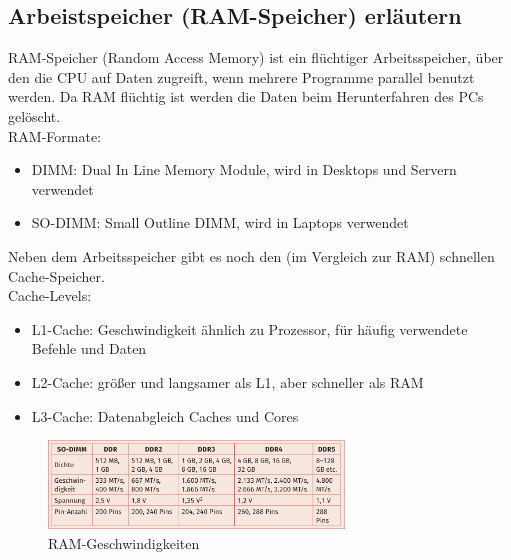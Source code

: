 \subsection{Arbeistspeicher (RAM-Speicher) erläutern}
    \begin{subindent}
        RAM-Speicher (Random Access Memory) ist ein flüchtiger Arbeitsspeicher, über den die CPU auf Daten zugreift, wenn mehrere Programme parallel benutzt werden. Da RAM flüchtig ist werden die Daten beim Herunterfahren des PCs gelöscht. \\
        RAM-Formate:
        \begin{itemize}[leftmargin=2.5cm,, itemsep=0.1em, parsep=0.3em]
            \item DIMM\@: Dual In Line Memory Module, wird in Desktops und Servern verwendet
            \item SO-DIMM\@: Small Outline DIMM, wird in Laptops verwendet
        \end{itemize}
        Neben dem Arbeitsspeicher gibt es noch den (im Vergleich zur RAM) schnellen Cache-Speicher. \\
        Cache-Levels:
        \begin{itemize}[leftmargin=2.5cm, itemsep=0.1em, parsep=0.3em]
            \item L1-Cache: Geschwindigkeit ähnlich zu Prozessor, für häufig verwendete Befehle und Daten
            \item L2-Cache: größer und langsamer als L1, aber schneller als RAM
            \item L3-Cache: Datenabgleich Caches und Cores
        \end{itemize}
    \end{subindent}

    \begin{figure}[ht]
        \centering
        \includegraphics[width=0.7\textwidth]{./images/2.4.4_ramspeeds.png}
        \caption{RAM-Geschwindigkeiten}\label{fig:RAM-Geschwindigkeiten}
    \end{figure}

